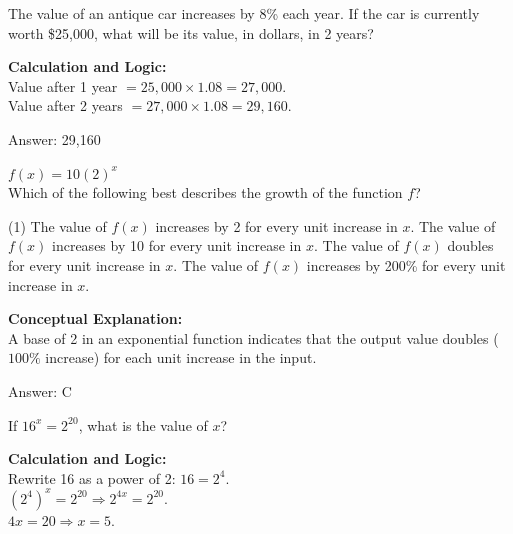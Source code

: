 \documentclass[11pt,paper=a4,answers]{exam}
\begin{document}
\begin{questions}
\vspace{40pt}

\question
The value of an antique car increases by 8\% each year. If the car is currently worth \$25,000, what will be its value, in dollars, in 2 years?

\begin{solution}
\textbf{Calculation and Logic:} \\
Value after 1 year $= 25,000 \times 1.08 = 27,000$. \\
Value after 2 years $= 27,000 \times 1.08 = 29,160$.

\vspace{25pt}

Answer: \colorbox{yellow!100}{29,160}
\end{solution}

\vspace{40pt}

\question
$f(x) = 10(2)^x$ \\
Which of the following best describes the growth of the function $f$?
\begin{tasks}(1)
    \task The value of $f(x)$ increases by 2 for every unit increase in $x$.
    \task The value of $f(x)$ increases by 10 for every unit increase in $x$.
    \task The value of $f(x)$ doubles for every unit increase in $x$.
    \task The value of $f(x)$ increases by 200\% for every unit increase in $x$.
\end{tasks}

\begin{solution}
\textbf{Conceptual Explanation:} \\
A base of 2 in an exponential function indicates that the output value doubles ($100\%$ increase) for each unit increase in the input.

\vspace{25pt}

Answer: \colorbox{yellow!100}{C}
\end{solution}

\vspace{40pt}

\question
If $16^x = 2^{20}$, what is the value of $x$?

\begin{solution}
\textbf{Calculation and Logic:} \\
Rewrite 16 as a power of 2: $16 = 2^4$. \\
$(2^4)^x = 2^{20} \Rightarrow 2^{4x} = 2^{20}$. \\
$4x = 20 \Rightarrow x = 5$.


\end{solution}
\end{questions}
\end{document}
